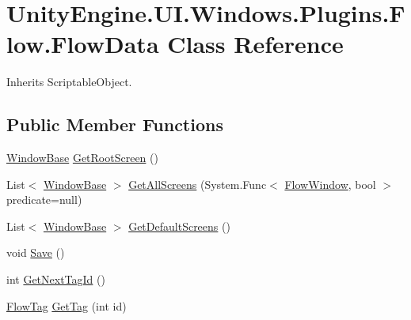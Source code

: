 \hypertarget{class_unity_engine_1_1_u_i_1_1_windows_1_1_plugins_1_1_flow_1_1_flow_data}{}\section{Unity\+Engine.\+U\+I.\+Windows.\+Plugins.\+Flow.\+Flow\+Data Class Reference}
\label{class_unity_engine_1_1_u_i_1_1_windows_1_1_plugins_1_1_flow_1_1_flow_data}


Inherits Scriptable\+Object.

\subsection*{Public Member Functions}
\begin{DoxyCompactItemize}
\item 
\hyperlink{class_unity_engine_1_1_u_i_1_1_windows_1_1_window_base}{Window\+Base} \hyperlink{class_unity_engine_1_1_u_i_1_1_windows_1_1_plugins_1_1_flow_1_1_flow_data_ae9f8a1b27812be83448042d672b9793c}{Get\+Root\+Screen} ()
\item 
List$<$ \hyperlink{class_unity_engine_1_1_u_i_1_1_windows_1_1_window_base}{Window\+Base} $>$ \hyperlink{class_unity_engine_1_1_u_i_1_1_windows_1_1_plugins_1_1_flow_1_1_flow_data_a8083380cf425e4efd00d8eb3c9043342}{Get\+All\+Screens} (System.\+Func$<$ \hyperlink{class_unity_engine_1_1_u_i_1_1_windows_1_1_plugins_1_1_flow_1_1_flow_window}{Flow\+Window}, bool $>$ predicate=null)
\item 
List$<$ \hyperlink{class_unity_engine_1_1_u_i_1_1_windows_1_1_window_base}{Window\+Base} $>$ \hyperlink{class_unity_engine_1_1_u_i_1_1_windows_1_1_plugins_1_1_flow_1_1_flow_data_ae5af07cde788b7c739a38c67cbd24360}{Get\+Default\+Screens} ()
\item 
void \hyperlink{class_unity_engine_1_1_u_i_1_1_windows_1_1_plugins_1_1_flow_1_1_flow_data_a5fd2ca4fafbf38c6c19675cede1f6657}{Save} ()
\item 
int \hyperlink{class_unity_engine_1_1_u_i_1_1_windows_1_1_plugins_1_1_flow_1_1_flow_data_abe0eebc9093be8253cae02b45ac8f599}{Get\+Next\+Tag\+Id} ()
\item 
\hyperlink{class_unity_engine_1_1_u_i_1_1_windows_1_1_plugins_1_1_flow_1_1_flow_tag}{Flow\+Tag} \hyperlink{class_unity_engine_1_1_u_i_1_1_windows_1_1_plugins_1_1_flow_1_1_flow_data_a44262cb52d11c4b09787b5186aabca80}{Get\+Tag} (int id)
\item 

\end{DoxyCompactItemize}
